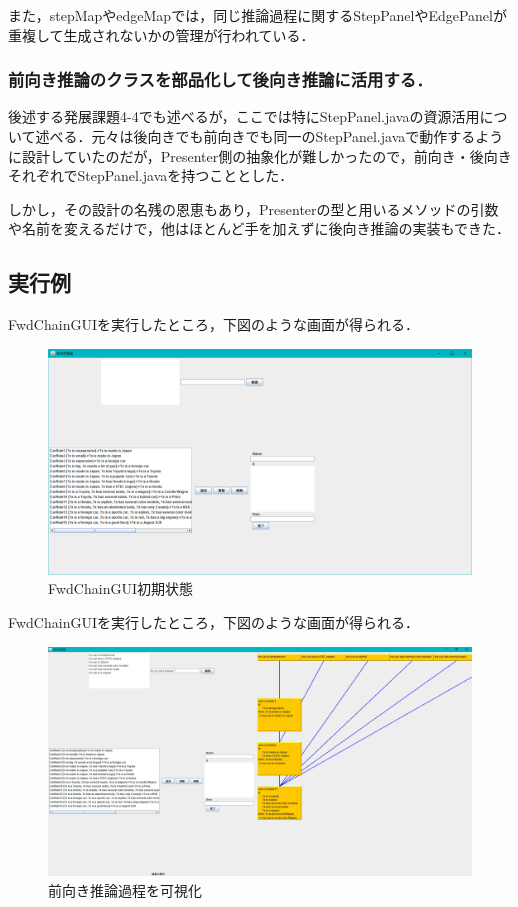 \documentclass[12pt]{jarticle}
\begin{document}
また，stepMapやedgeMapでは，同じ推論過程に関するStepPanelやEdgePanelが重複して生成されないかの管理が行われている．


\subsubsection{前向き推論のクラスを部品化して後向き推論に活用する．}
後述する発展課題4-4でも述べるが，ここでは特にStepPanel.javaの資源活用について述べる．元々は後向きでも前向きでも同一のStepPanel.javaで動作するように設計していたのだが，Presenter側の抽象化が難しかったので，前向き・後向きそれぞれでStepPanel.javaを持つこととした．

しかし，その設計の名残の恩恵もあり，Presenterの型と用いるメソッドの引数や名前を変えるだけで，他はほとんど手を加えずに後向き推論の実装もできた．
\clearpage

\subsection{実行例}
FwdChainGUIを実行したところ，下図のような画面が得られる．

\begin{figure}[!hbt]
  	\begin{center}
  		\includegraphics[scale=0.35]{images/gui1.png}
	\end{center}
  	\caption{FwdChainGUI初期状態}
\end{figure}
\clearpage

FwdChainGUIを実行したところ，下図のような画面が得られる．

\begin{figure}[!hbt]
  	\begin{center}
  		\includegraphics[scale=0.25]{images/gui2.png}
	\end{center}
  	\caption{前向き推論過程を可視化}
\end{figure}
\clearpage
\end{document}
